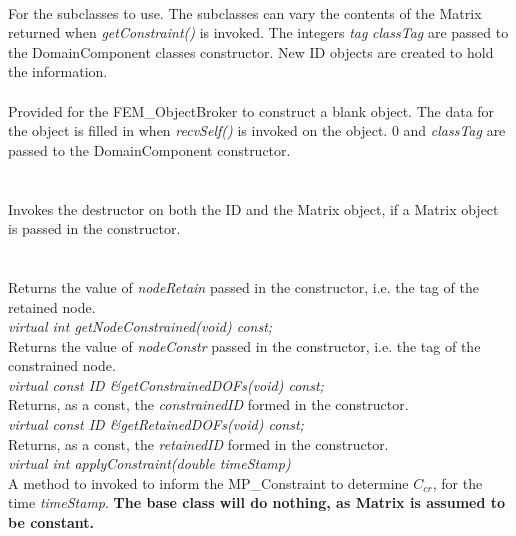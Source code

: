 \\
For the subclasses to use. The subclasses can vary the contents of the
Matrix returned when {\em getConstraint()} is invoked. 
The integers {\em tag} {\em classTag} are
passed to the DomainComponent classes constructor. New ID objects are
created to hold the information. \\

 \\
Provided for the FEM\_ObjectBroker to construct a blank object. The
data for the object is filled in when {\em recvSelf()} is invoked on
the object. $0$ and {\em classTag} are passed to the DomainComponent
constructor. \\ 

  \\
 \\
Invokes the destructor on both the ID and the Matrix object, if a
Matrix object is passed in the constructor. \\

  \\
 \\
Returns the value of {\em nodeRetain} passed in the constructor,
i.e. the tag of the retained node. \\

{\em virtual int getNodeConstrained(void) const;    }\\
Returns the value of {\em nodeConstr} passed in the constructor, i.e. the
tag of the constrained node. \\

{\em virtual const ID \&getConstrainedDOFs(void) const;   }\\     
Returns, as a const, the {\em constrainedID} formed in the constructor. \\

{\em virtual const ID \&getRetainedDOFs(void) const;   }\\     
Returns, as a const, the {\em retainedID} formed in the
constructor. \\

{\em virtual int applyConstraint(double timeStamp)}\\     
A method to invoked to inform the MP\_Constraint to determine $C_{cr}$,
for the time {\em timeStamp}. {\bf The base class will do nothing, as
Matrix is assumed to be constant.} \\

